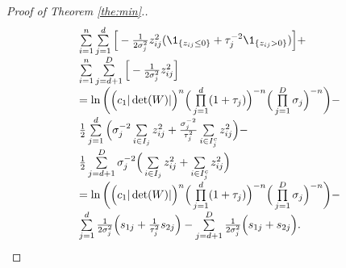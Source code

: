 \begin{proof}[Proof of Theorem \ref{the:min}.]
$$\begin{array}{l}
 \sum\limits_{i=1}^{n} \sum\limits_{j=1}^{d} \Big[ -\frac{1}{2\sigma_j^2}z_{ij}^2 (\1_{ \{ z_{ij} \leq 0 \} } + \tau_{j}^{-2} \1_{ \{ z_{ij} > 0 \} })\Big] +  \\[6pt]
 \sum\limits_{i=1}^{n} \sum\limits_{j=d+1}^{D} \Big[ -\frac{1}{2\sigma_j^2}z_{ij}^2 \Big]  \\[6pt]
= \ln \bigg( \Big( c_1|\det(W)| \Big)^{n} \Big( \prod\limits_{j=1}^{d} (1+\tau_j) \Big)^{-n} \Big( \prod\limits_{j=1}^{D} \sigma_j \Big)^{-n} \bigg)  - \\[6pt]
  \frac{1}{2} \sum\limits_{j=1}^{d} \Big( \sigma_j^{-2} \sum\limits_{i \in I_{j}}    z_{ij}^2   + \frac{\sigma_j^{-2}}{\tau_{j}^{2} }  \sum\limits_{i \in I_{j}^{c}}   z_{ij}^2  \Big) -  \\[6pt]
  \frac{1}{2} \sum\limits_{j=d+1}^{D} \sigma_j^{-2} \Big( \sum\limits_{i \in I_{j}}    z_{ij}^2   +  \sum\limits_{i \in I_{j}^{c}}   z_{ij}^2  \Big) \\[6pt]
= \ln \bigg( \Big( c_1|\det(W)| \Big)^{n} \Big( \prod\limits_{j=1}^{d} (1+\tau_j) \Big)^{-n} \Big( \prod\limits_{j=1}^{D} \sigma_j \Big)^{-n} \bigg) - \\[6pt]
 \sum\limits_{j=1}^{d} \frac{1}{2\sigma_j^{2}} \Big(  s_{1j}  + \frac{1}{\tau_{j}^{2} }  s_{2j}  \Big) - \sum\limits_{j=d+1}^{D} \frac{1}{2\sigma_j^{2}} \Big(  s_{1j}  + s_{2j}  \Big).
\end{array}
$$


\end{proof}
